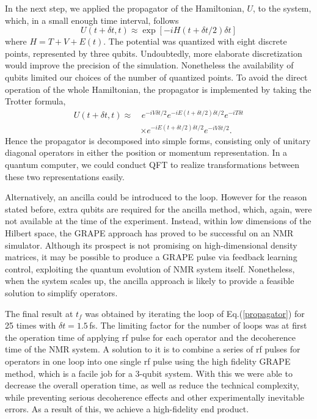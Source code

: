 \documentclass[8.5pt,twoside,twocolumn]{article}
\newcommand{\nl}{\nonumber \\}
\begin{document}
In the next step, we applied the propagator of the Hamiltonian,
$U$, to the system, which, in a small
enough time interval, follows
\[U(t+\delta t,t) \approx \exp[-iH(t+\delta t/2)\delta t]\]
where $H = T + V + E(t)$.
The potential was quantized with eight discrete points,
represented by three qubits.
Undoubtedly, more elaborate discretization would
improve the precision of the simulation.
Nonetheless the availability of qubits limited our choices of
the number of quantized points.
To avoid the direct operation of the whole Hamiltonian,
the propagator is implemented by taking the Trotter formula,\cite{first_quantization_2,Trotter_1,Trotter_2}
\begin{align}\label{propagator}
 {U}(t+\delta t,t)\approx &\,
 e^{-i {V} \delta t/2} e^{-i {E} (t+\delta t/2)  \delta t/2}
 e^{-i {T} \delta t}   \nl & \times e^{-i {E} (t+\delta t/2)           \delta t/2}
 e^{-i {V} \delta t/2} .
\end{align}
Hence the propagator is decomposed into simple forms, consisting only of
unitary diagonal operators in either the position or momentum representation.
In a quantum computer, we could conduct QFT to realize transformations
between these two representations easily.

Alternatively, an ancilla\cite{Polynomial_time_algorithm}
could be introduced to the loop.
However for the reason stated before,
extra qubits are required for the ancilla method,
which, again, were not available at the time of the experiment.
Instead, within low dimensions of the Hilbert space,
the GRAPE approach has proved to be
successful on an NMR simulator. Although its prospect is not
promising on high-dimensional density matrices,
it may be possible to produce a GRAPE pulse via feedback
learning control, exploiting the quantum evolution of
NMR system itself. Nonetheless, when the system scales up,
the ancilla approach is likely to provide a feasible solution
to simplify operators.

The final result at $t_f$
was obtained by iterating the loop of Eq.(\ref{propagator})
for 25 times with $\delta t=1.5\,$fs.
The limiting factor for the number of loops was at first
the operation time of applying rf pulse
for each operator and the decoherence time of the NMR system.
A solution to it is to combine a series of rf pulses for operators
in one loop
into one single rf pulse using the high fidelity GRAPE method,
which is a facile job for a 3-qubit system. With this
we were able to decrease the overall operation time,
as well as reduce the technical complexity,
while preventing serious decoherence effects
and other experimentally inevitable errors.
As a result of this, we achieve a high-fidelity end product.
\end{document}
